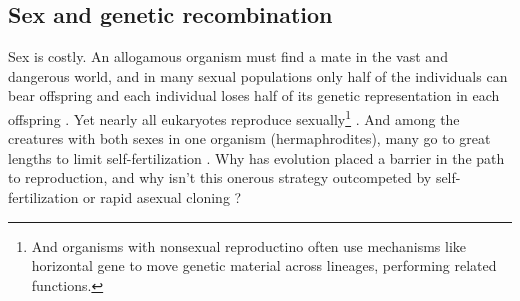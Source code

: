 \documentclass[11pt]{article}
\begin{document}





\subsection{Sex and genetic recombination}


Sex is costly. An allogamous organism must find a mate in the vast and dangerous world, and in many sexual populations only half of the individuals can bear offspring and each individual loses half of its genetic representation in each offspring \citep{smith1971origin, lehtonen2012many, goodenough2014origins}. Yet nearly all eukaryotes reproduce sexually\footnote{And organisms with nonsexual reproductino often use mechanisms like horizontal gene to move genetic material across lineages, performing related functions.}
 \citep{speijer2015sex, bell1982masterpiece}. And among the creatures with both sexes in one organism (hermaphrodites), many go to great lengths to limit self-fertilization \citep{charlesworth2005plant, de1997incompatibility, jarne2006animals}. Why has evolution placed a barrier in the path to reproduction, and why isn't this onerous strategy outcompeted by self-fertilization or rapid asexual cloning \citep{smith1978evolution}?
\end{document}
